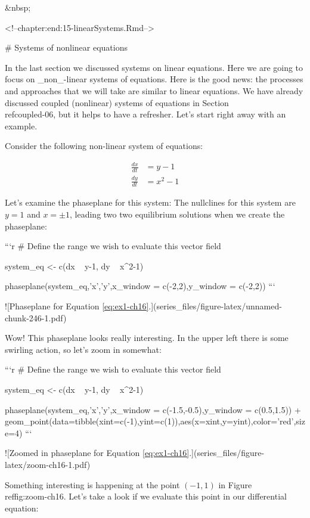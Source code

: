 \documentclass[
]{book}
\theoremstyle{definition}
\theoremstyle{definition}
\theoremstyle{definition}
\theoremstyle{remark}
\begin{document}
&nbsp;


<!--chapter:end:15-linearSystems.Rmd-->

# Systems of nonlinear equations

In the last section we discussed systems on linear equations.  Here we are going to focus on _non_-linear systems of equations.  Here is the good news: the processes and approaches that we will take are similar to linear equations.  We have already discussed coupled (nonlinear) systems of equations in Section \\ref{coupled-06}, but it helps to have a refresher. Let's start right away with an example.

Consider the following non-linear system of equations:

\begin{equation}
\begin{split} 
\frac{dx}{dt} &= y-1 \\  \label{eq:ex1-ch16}
\frac{dy}{dt} &= x^{2}-1 
\end{split}
\end{equation}

Let's examine the phaseplane for this system:
The nullclines for this system are $y=1$ and $x=\pm1$, leading two two equilibrium solutions when we create the phaseplane:


```r
# Define the range we wish to evaluate this vector field


system_eq <- c(dx ~ y-1,
               dy ~ x^2-1)

phaseplane(system_eq,'x','y',x_window = c(-2,2),y_window = c(-2,2))
```

![\label{fig:unnamed-chunk-246}Phaseplane for Equation \ref{eq:ex1-ch16}.](series_files/figure-latex/unnamed-chunk-246-1.pdf) 

Wow!  This phaseplane looks really interesting.  In the upper left there is some swirling action, so let's zoom in somewhat:


```r
# Define the range we wish to evaluate this vector field


system_eq <- c(dx ~ y-1,
               dy ~ x^2-1)

phaseplane(system_eq,'x','y',x_window = c(-1.5,-0.5),y_window = c(0.5,1.5)) +
  geom_point(data=tibble(xint=c(-1),yint=c(1)),aes(x=xint,y=yint),color='red',size=4)
```

![\label{fig:zoom-ch16}Zoomed in phaseplane for Equation \ref{eq:ex1-ch16}.](series_files/figure-latex/zoom-ch16-1.pdf) 

Something interesting is happening at the point $(-1,1)$ in Figure \\ref{fig:zoom-ch16}.  Let's take a look if we evaluate this point in our differential equation:
\end{document}
